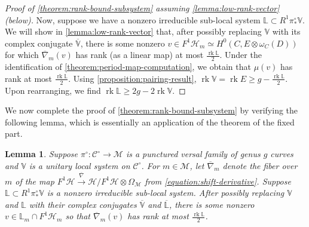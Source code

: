 \documentclass[12 pt]{amsart}
\theoremstyle{plain}
\newtheorem{lemma}[subsubsection]{Lemma}
\theoremstyle{definition}
\theoremstyle{remark}
\numberwithin{equation}{section}
\DeclareMathOperator\rk{rk}
\begin{document}
\begin{proof}[Proof of \autoref{theorem:rank-bound-subsystem} assuming
	\autoref{lemma:low-rank-vector} (below)]
Now, suppose we have a nonzero irreducible sub-local system $\mathbb L \subset R^1 \pi^\circ_* \mathbb
V$.
We will show in \autoref{lemma:low-rank-vector} that, after possibly replacing $\mathbb{V}$ with its complex conjugate $\overline{\mathbb{V}}$, there is some nonzero $v \in
F^1\mathscr{H}_m \simeq
H^0(C, E \otimes \omega_C(D))$ for which
$\overline{\nabla}_m(v)$ has rank (as a linear map) at most $\frac{\rk \mathbb L}{2}$. 
Under the identification of
\autoref{theorem:period-map-computation},
we obtain that $\mu(v)$ has rank at most $\frac{\rk \mathbb L}{2}$. 
Using \autoref{proposition:pairing-result}, $\rk \mathbb{V}=\rk
E \geq g-\frac{\rk \mathbb L}{2}$. Upon rearranging, we find $\rk\mathbb{L}\geq 2g-2\rk\mathbb{V}$.
\end{proof}

We now complete the proof of \autoref{theorem:rank-bound-subsystem} by verifying
the following lemma, which is essentially an application of the theorem of the
fixed part.
\begin{lemma}\label{lemma:low-rank-vector}
Suppose $\pi^\circ:\mathscr{C}^\circ\to \mathscr{M}$ is a punctured versal family of genus
$g$ curves and $\mathbb{V}$ is a unitary local system on $\mathscr{C}^\circ$. 
For $m \in \mathscr M$, let $\overline{\nabla}_m$ denote the fiber over $m$ of
the map $F^1\mathscr{H} \xrightarrow{\overline{\nabla}} \mathscr{H}/F^1
\mathscr{H} \otimes \Omega_{\mathscr M}$
from \eqref{equation:shift-derivative}.
Suppose 
$\mathbb L \subset R^1 \pi^\circ_* \mathbb V$
is a nonzero irreducible sub-local system.
After possibly replacing $\mathbb{V}$ and $\mathbb L$ with their complex
conjugates
$\overline{\mathbb{V}}$ and $\overline{\mathbb L}$, there is some nonzero $v \in \mathbb L_m \cap F^1
\mathscr H_m$ so that
$\overline{\nabla}_m(v)$ has rank at most $\frac{\rk \mathbb L}{2}$.
\end{lemma}
\end{document}
